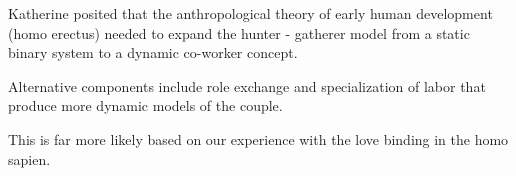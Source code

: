

Katherine posited that the anthropological theory of early human
development (homo erectus) needed to expand the hunter - gatherer
model from a static binary system to a dynamic co-worker concept.

Alternative components include role exchange and specialization of
labor that produce more dynamic models of the couple.

This is far more likely based on our experience with the love binding
in the homo sapien.

\bye
